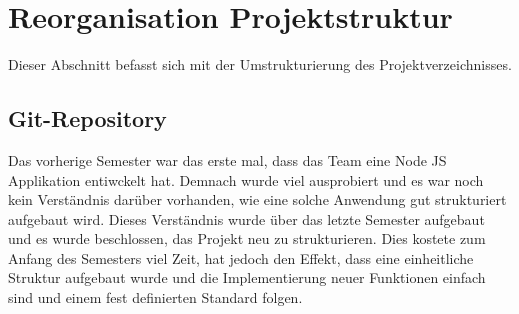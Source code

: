 \section{Reorganisation Projektstruktur}\label{sec:section-two}

Dieser Abschnitt befasst sich mit der Umstrukturierung des Projektverzeichnisses.

\subsection{Git-Repository}\label{subsec:subsection-two-one}

Das vorherige Semester war das erste mal, dass das Team eine Node JS Applikation entiwckelt hat.
Demnach wurde viel ausprobiert und es war noch kein Verständnis darüber vorhanden, wie eine solche Anwendung gut strukturiert aufgebaut wird.
Dieses Verständnis wurde über das letzte Semester aufgebaut und es wurde beschlossen, das Projekt neu zu strukturieren.
Dies kostete zum Anfang des Semesters viel Zeit, hat jedoch den Effekt, dass eine einheitliche Struktur aufgebaut wurde und die Implementierung neuer Funktionen einfach sind und einem fest definierten Standard folgen.

